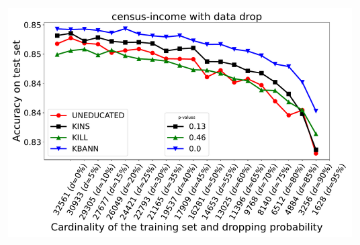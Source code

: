 \begin{figure}
\begin{subfigure}{\cellsize}
		\includegraphics[width=\linewidth]{figures/drop/census-income/uneducated-kins-kill-kbann-accuracy-average-curves}
	\end{subfigure}


\end{figure}
